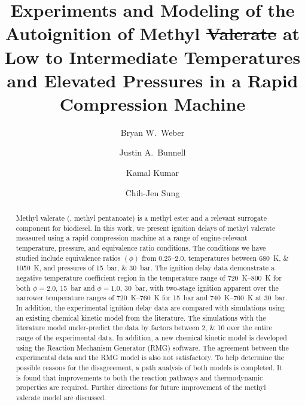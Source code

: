 \documentclass[letterpaper, review, sort&compress]{elsarticle}
\providecommand{\DIFadd}[1]{{\protect\color{blue}\uwave{#1}}} %
\providecommand{\DIFdel}[1]{{\protect\color{red}\sout{#1}}}                      %
\providecommand{\DIFaddbegin}{} %
\providecommand{\DIFaddend}{} %
\providecommand{\DIFdelbegin}{} %
\providecommand{\DIFdelend}{} %
\newcommand{\DIFscaledelfig}{0.5}
\newlength{\DIFdelgraphicswidth} %
\newlength{\DIFdelgraphicsheight} %
\newcommand{\DIFaddincludegraphics}[2][]{{\color{blue}\fbox{\DIFOincludegraphics[#1]{#2}}}} %
\newcommand{\DIFdelincludegraphics}[2][]{%
\sbox{\DIFdelgraphicsbox}{\DIFOincludegraphics[#1]{#2}}%
\settoboxwidth{\DIFdelgraphicswidth}{\DIFdelgraphicsbox} %
\settoboxtotalheight{\DIFdelgraphicsheight}{\DIFdelgraphicsbox} %
\scalebox{\DIFscaledelfig}{%
\parbox[b]{\DIFdelgraphicswidth}{\usebox{\DIFdelgraphicsbox}\\[-\baselineskip] \rule{\DIFdelgraphicswidth}{0em}}\llap{\resizebox{\DIFdelgraphicswidth}{\DIFdelgraphicsheight}{%
\setlength{\unitlength}{\DIFdelgraphicswidth}%
\begin{picture}(1,1)%
\thicklines\linethickness{2pt} %
{\color[rgb]{1,0,0}\put(0,0){\framebox(1,1){}}}%
{\color[rgb]{1,0,0}\put(0,0){\line( 1,1){1}}}%
{\color[rgb]{1,0,0}\put(0,1){\line(1,-1){1}}}%
\end{picture}%
}\hspace*{3pt}}} %
} %
\DeclareRobustCommand{\DIFaddbegin}{\DIFOaddbegin \let\includegraphics\DIFaddincludegraphics} %
\DeclareRobustCommand{\DIFaddend}{\DIFOaddend \let\includegraphics\DIFOincludegraphics} %
\DeclareRobustCommand{\DIFdelbegin}{\DIFOdelbegin \let\includegraphics\DIFdelincludegraphics} %
\DeclareRobustCommand{\DIFdelend}{\DIFOaddend \let\includegraphics\DIFOincludegraphics} %
\begin{document}
\begin{frontmatter}
\title{ Experiments and Modeling of the Autoignition of Methyl \DIFdelbegin \DIFdel{Valerate }\DIFdelend \DIFaddbegin \DIFadd{Pentanoate }\DIFaddend at Low to Intermediate Temperatures and Elevated Pressures in a Rapid Compression Machine }

\author[uconn]{Bryan W.\ Weber}
\author[uconn]{Justin A.\ Bunnell}
\author[idaho]{Kamal Kumar}
\author[uconn]{Chih-Jen Sung}
\address[uconn]{Department of Mechanical Engineering, University of Connecticut, Storrs, CT, USA}
\address[idaho]{Department of Mechanical Engineering, University of Idaho, Moscow, ID, USA}

\begin{abstract} %

    Methyl valerate (, methyl pentanoate) is a methyl ester and a relevant surrogate
    component for biodiesel. In this work, we present ignition delays of methyl valerate measured
    using a rapid compression machine at a range of engine-relevant temperature, pressure, and
    equivalence ratio conditions. The conditions we have studied include equivalence ratios
    \((\phi)\) from \numrange{0.25}{2.0}, temperatures between \SIlist{680;1050}{\K}, and pressures
    of \SIlist{15;30}{\bar}. The ignition delay data demonstrate a negative temperature coefficient
    region in the temperature range of \SIrange[range-phrase={--}]{720}{800}{\K} for both
    \(\phi=2.0\), \SI{15}{\bar} and \(\phi=1.0\), \SI{30}{\bar}, with two-stage ignition apparent
    over the narrower temperature ranges of \SIrange[range-phrase={--}]{720}{760}{\K} for
    \SI{15}{\bar} and \SIrange[range-phrase={--}]{740}{760}{\K} at \SI{30}{\bar}. In addition, the
    experimental ignition delay data are compared with simulations using an existing chemical
    kinetic model from the literature. The simulations with the literature model under-predict the
    data by factors between \numlist{2;10} over the entire range of the experimental data. In
    addition, a new chemical kinetic model is developed using the Reaction Mechanism Generator (RMG)
    software. The agreement between the experimental data and the RMG model is also not
    satisfactory. To help determine the possible reasons for the disagreement, a path analysis of
    both models is completed. It is found that improvements to both the reaction pathways and
    thermodynamic properties are required. Further directions for future improvement of the methyl
    valerate model are discussed.


\end{abstract}
\end{frontmatter}
\end{document}
